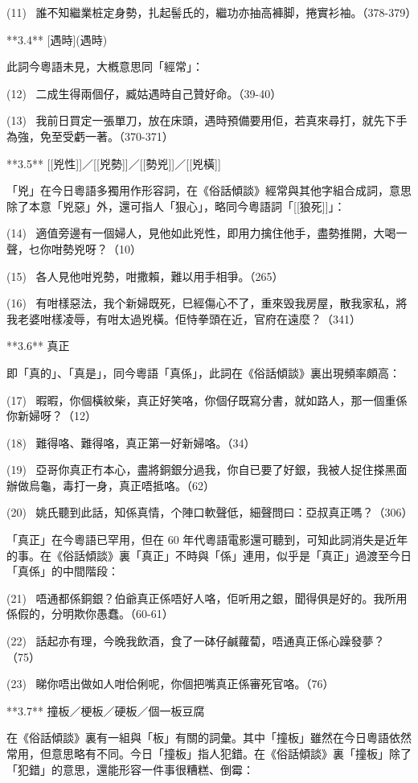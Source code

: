 (11)  誰不知繼業桩定身勢，扎起髻氏的，繼功亦抽高褲脚，捲實衫袖。（378-379）

**3.4** [遇時](遇時)

此詞今粵語未見，大槪意思同「經常」：

(12)  二成生得兩個仔，臧姑遇時自己贊好命。（39-40）

(13)  我前日買定一張單刀，放在床頭，遇時預備要用佢，若真來尋打，就先下手為強，免至受虧一著。（370-371）

**3.5** [[兇性]]／[[兇勢]]／[[勢兇]]／[[兇橫]]

「兇」在今日粵語多獨用作形容詞，在《俗話傾談》經常與其他字組合成詞，意思除了本意「兇惡」外，還可指人「狠心」，略同今粵語詞「[[狼死]]」：

(14)  適值旁邊有一個婦人，見他如此兇性，即用力擒住他手，盡勢推開，大喝一聲，乜你咁勢兇呀？（10）

(15)  各人見他咁兇勢，咁撒賴，難以用手相爭。（265）

(16)  有咁樣惡法，我个新婦既死，巳經傷心不了，重來毁我房屋，散我家私，將我老婆咁樣凌辱，有咁太過兇橫。佢恃拳頭在近，官府在遠麼？（341）

**3.6** 真正

即「真的」、「真是」，同今粵語「真係」，此詞在《俗話傾談》裏出現頻率頗高：

(17)  暇暇，你個橫紋柴，真正好笑咯，你個仔既寫分書，就如路人，那一個重係你新婦呀？（12）

(18)  難得咯、難得咯，真正第一好新婦咯。（34）

(19)  亞哥你真正冇本心，盡將銅銀分過我，你自已要了好銀，我被人捉住搽黑面辦做烏龜，毒打一身，真正唔抵咯。（62）

(20)  姚氏聽到此話，知係真情，个陣口軟聲低，細聲問曰：亞叔真正嗎？（306）

「真正」在今粵語已罕用，但在 60 年代粵語電影還可聽到，可知此詞消失是近年的事。在《俗話傾談》裏「真正」不時與「係」連用，似乎是「真正」過渡至今日「真係」的中間階段：

(21)  唔通都係銅銀？伯爺真正係唔好人咯，佢听用之銀，聞得俱是好的。我所用係假的，分明欺你愚蠢。（60-61）

(22)  話起亦有理，今晚我飲酒，食了一砵仔鹹蘿蔔，唔通真正係心躁發夢？（75）

(23)  睇你唔出做如人咁佮俐呢，你個把嘴真正係審死官咯。（76）

**3.7** 撞板／梗板／硬板／個一板豆腐

在《俗話傾談》裏有一組與「板」有關的詞彙。其中「撞板」雖然在今日粵語依然常用，但意思略有不同。今日「撞板」指人犯錯。在《俗話傾談》裏「撞板」除了「犯錯」的意思，還能形容一件事很糟糕、倒霉：

